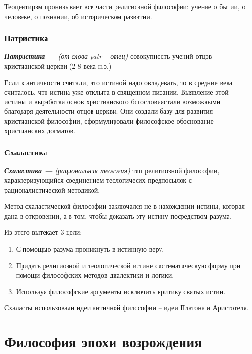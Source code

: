 \documentclass[a4paper, 14pt]{extreport}
\begin{document}
Теоцентирзм пронизывает все части религиозной философии: учение о бытии,
о человеке, о познании, об историческом развитии.

\subsection{Патристика}

\emph{\textbf{Патристика ---} (от слова patr -- отец)}
совокупность учений отцов христианской церкви (2-8 века н.э.)


Если в античности считали, что истиной надо овладевать, то в средние
века считалось, что истина уже отклыта в священном писании. Выявление
этой истины и выработка основ христианского богословиястали возможными
благодаря деятельности отцов церкви. Они создали базу для развития
христианской философии, сформулировали философское обоснование
христианских догматов.

\subsection{Схаластика}

\emph{\textbf{Схаластика ---} (рациональная теология)}
тип религиозной философии, характеризующийся соединением теологичесих
предпосылок с рационалистической методикой.


Метод схаластической философии заключался не в нахождении истины,
которая дана в откровении, а в том, чтобы доказать эту истину
посредством разума.

Из этого вытекает 3 цели:

\begin{enumerate}
\def\labelenumi{\arabic{enumi}.}

\item
  С помощью разума проникнуть в истинную веру.
\item
  Придать религиозной и теологической истине систематическую форму при
  помощи философских методов диалектики и логики.
\item
  Используя философские аргументы исключить критику святых истин.
\end{enumerate}

Схаласты использовали идеи античной философии -- идеи Платона и
Аристотеля.

\chapter{Философия эпохи возрождения}
\end{document}
